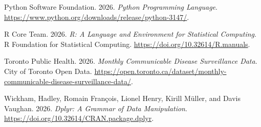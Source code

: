 \documentclass[
  letterpaper,
  DIV=11,
  numbers=noendperiod]{scrartcl}
\newlength{\cslhangindent}
\newenvironment{CSLReferences}[2] %
 {\begin{list}{}{%
  \setlength{\itemindent}{0pt}
  \setlength{\leftmargin}{0pt}
  \setlength{\parsep}{0pt}
  \ifodd #1
   \setlength{\leftmargin}{\cslhangindent}
   \setlength{\itemindent}{-1\cslhangindent}
  \fi
  \setlength{\itemsep}{#2\baselineskip}}}
 {\end{list}}
\begin{document}
\begin{CSLReferences}{1}{1}
Python Software Foundation. 2026. \emph{{Python} Programming Language}.
\url{https://www.python.org/downloads/release/python-3147/}.

R Core Team. 2026. \emph{R: A Language and Environment for Statistical
Computing}. R Foundation for Statistical Computing.
\url{https://doi.org/10.32614/R.manuals}.

Toronto Public Health. 2026. \emph{Monthly Communicable Disease
Surveillance Data}. City of Toronto Open Data.
\url{https://open.toronto.ca/dataset/monthly-communicable-disease-surveillance-data/}.

Wickham, Hadley, Romain François, Lionel Henry, Kirill Müller, and Davis
Vaughan. 2026. \emph{Dplyr: A Grammar of Data Manipulation}.
\url{https://doi.org/10.32614/CRAN.package.dplyr}.

\end{CSLReferences}
\end{document}
